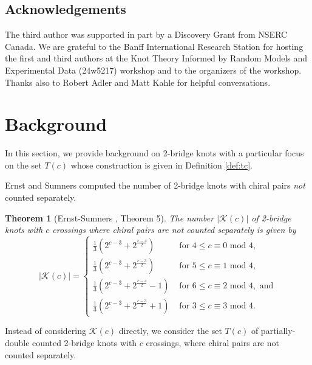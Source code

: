 \documentclass[12pt]{amsart}
\newtheorem{theorem}{Theorem}[section]
\theoremstyle{definition}
\theoremstyle{remark}
\numberwithin{equation}{section}
\begin{document}
\subsection{Acknowledgements}  
The third author was supported in part by a Discovery Grant from NSERC Canada. We are grateful to the Banff International Research Station for hosting the first and third authors at the Knot Theory Informed by Random Models and Experimental Data (24w5217) workshop and to the organizers of the workshop. Thanks also to Robert Adler and Matt Kahle for helpful conversations. 


\section{Background}
\label{sec:background}

In this section, we provide background on 2-bridge knots with a particular focus on the set $T(c)$ whose construction is given in Definition \ref{def:tc}.

Ernst and Sumners computed the number of 2-bridge knots with chiral pairs \textit{not} counted separately.
\begin{theorem}[Ernst-Sumners \cite{ErnSum}, Theorem 5]
\label{thm:ernstsumners}
The number $|\mathcal{K}(c)|$ of 2-bridge knots with $c$ crossings where chiral pairs are \emph{not} counted separately is given by
\[
|\mathcal{K}(c)| = 
\begin{cases}
\frac{1}{3}(2^{c-3}+2^{\frac{c-4}{2}}) & \text{ for }4 \leq c\equiv 0 \text{ mod }4,\\
\frac{1}{3}(2^{c-3}+2^{\frac{c-3}{2}}) & \text{ for }5\leq c\equiv 1 \text{ mod }4, \\
\frac{1}{3}(2^{c-3}+2^{\frac{c-4}{2}}-1) & \text{ for }6 \leq c\equiv 2 \text{ mod }4, \text{ and}\\
\frac{1}{3}(2^{c-3}+2^{\frac{c-3}{2}}+1) & \text{ for }3\leq c\equiv 3 \text{ mod }4.
\end{cases}
\]
\end{theorem}

Instead of considering $\mathcal{K}(c)$ directly, we consider the set $T(c)$ of partially-double counted 2-bridge knots with $c$ crossings, where chiral pairs are not counted separately.  
\end{document}
